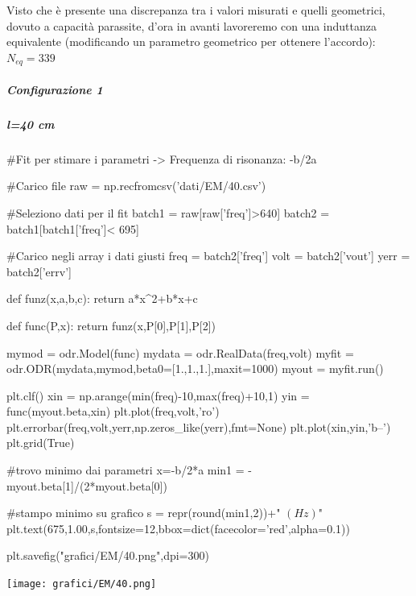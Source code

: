 Visto che è presente una discrepanza tra i valori misurati e quelli geometrici, dovuto a capacità parassite, d'ora in avanti lavoreremo con una induttanza equivalente (modificando un parametro geometrico per ottenere l'accordo): $N_{eq} = 339$

\subparagraph*{Configurazione 1}

\subparagraph*{l=40 cm}

\begin{sagesilent}

 #Fit per stimare i parametri -> Frequenza di risonanza: -b/2a

#Carico file
raw = np.recfromcsv('dati/EM/40.csv')

#Seleziono dati per il fit
batch1 = raw[raw['freq']>640]
batch2 = batch1[batch1['freq']< 695]

#Carico negli array i dati giusti
freq = batch2['freq']
volt = batch2['vout']
yerr = batch2['errv']


def funz(x,a,b,c):
    return a*x^2+b*x+c

def func(P,x):
    return funz(x,P[0],P[1],P[2])

mymod = odr.Model(func)
mydata = odr.RealData(freq,volt)
myfit = odr.ODR(mydata,mymod,beta0=[1.,1.,1.],maxit=1000)
myout = myfit.run()

plt.clf()
xin = np.arange(min(freq)-10,max(freq)+10,1)
yin = func(myout.beta,xin)
plt.plot(freq,volt,'ro')
plt.errorbar(freq,volt,yerr,np.zeros_like(yerr),fmt=None)
plt.plot(xin,yin,'b--')
plt.grid(True)

#trovo minimo dai parametri x=-b/2*a
min1 = -myout.beta[1]/(2*myout.beta[0]) 

#stampo minimo su grafico
s = repr(round(min1,2))+" $(Hz)$"
plt.text(675,1.00,s,fontsize=12,bbox=dict(facecolor='red',alpha=0.1))

plt.savefig("grafici/EM/40.png",dpi=300)
 
\end{sagesilent}

\texttt{[image: grafici/EM/40.png]}

